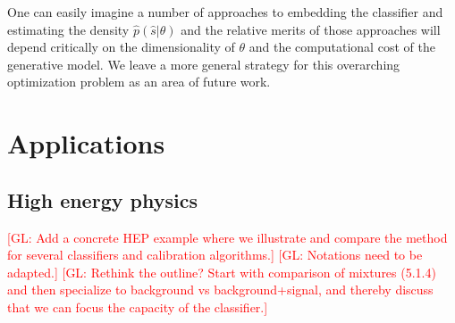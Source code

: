 \documentclass[12pt]{article}
\numberwithin{equation}{section}
\theoremstyle{plain}
\newcommand{\glnote}[1]{\textcolor{red}{[GL: #1]}}
\begin{document}

One can easily imagine a number of approaches to embedding the classifier and
estimating the density $\hat p(\hat s|\theta)$ and the relative merits of those
approaches will depend critically on the dimensionality of $\theta$ and the
computational cost of the generative model. We leave a more general strategy for
this overarching optimization problem as an area of future work.




\section{Applications}

\subsection{High energy physics}

\glnote{Add a concrete HEP example where we illustrate and compare
the method for several classifiers and calibration algorithms.}
\glnote{Notations need to be adapted.}
\glnote{Rethink the outline? Start with comparison of mixtures (5.1.4) and then
specialize to background vs background+signal, and thereby discuss that we can
focus the capacity of the classifier.}
\end{document}
